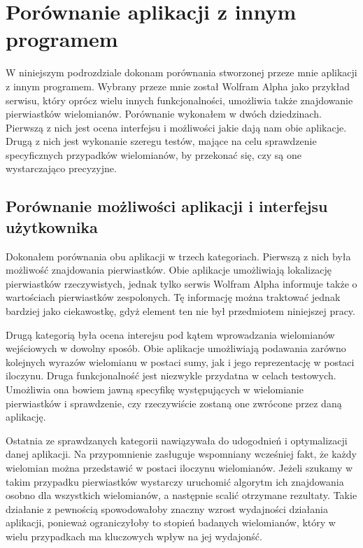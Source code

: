 \section {Porównanie aplikacji z innym programem}

W niniejszym podrozdziale dokonam porównania stworzonej przeze mnie aplikacji z innym programem. Wybrany przeze mnie został Wolfram Alpha jako przykład serwisu, który oprócz wielu innych funkcjonalności, umożliwia także znajdowanie pierwiastków wielomianów. Porównanie wykonałem w dwóch dziedzinach. Pierwszą z nich jest ocena interfejsu i możliwości jakie dają nam obie aplikacje. Drugą z nich jest wykonanie szeregu testów, mające na celu sprawdzenie specyficznych przypadków wielomianów, by przekonać się, czy są one wystarczająco precyzyjne.

\subsection {Porównanie możliwości aplikacji i interfejsu użytkownika}

Dokonałem porównania obu aplikacji w trzech kategoriach. Pierwszą z nich była możliwość znajdowania pierwiastków. Obie aplikacje umożliwiają lokalizację pierwiastków rzeczywistych, jednak tylko serwis Wolfram Alpha informuje także o wartościach pierwiastków zespolonych. Tę informację można traktować jednak bardziej jako ciekawostkę, gdyż element ten nie był przedmiotem niniejszej pracy.

Drugą kategorią była ocena interejsu pod kątem wprowadzania wielomianów wejściowych w dowolny sposób. Obie aplikacje umożliwiają podawania zarówno kolejnych wyrazów wielomianu w postaci sumy, jak i jego reprezentację w postaci iloczynu. Druga funkcjonalność jest niezwykle przydatna w celach testowych. Umożliwia ona bowiem jawną specyfikę występujących w wielomianie pierwiastków i sprawdzenie, czy rzeczywiście zostaną one zwrócone przez daną aplikację.

Ostatnia ze sprawdzanych kategorii nawiązywała do udogodnień i optymalizacji danej aplikacji. Na przypomnienie zasługuje wspomniany wcześniej fakt, że każdy wielomian można przedstawić w postaci iloczynu wielomianów. Jeżeli szukamy w takim przypadku pierwiastków wystarczy uruchomić algorytm ich znajdowania osobno dla wszystkich wielomianów, a następnie scalić otrzymane rezultaty. Takie działanie z pewnością spowodowałoby znaczny wzrost wydajności działania aplikacji, ponieważ ograniczyłoby to stopień badanych wielomianów, który w wielu przypadkach ma kluczowych wpływ na jej wydajonść.

